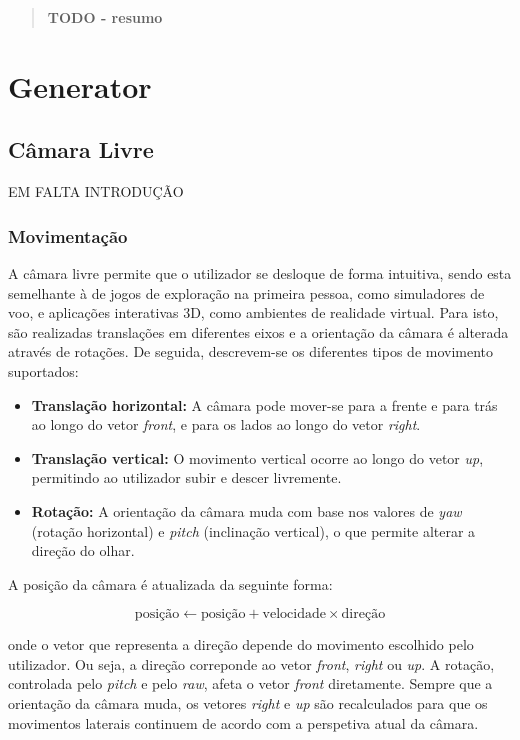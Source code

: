 \documentclass[12pt, a4paper]{article}
\begin{document}
\pagebreak

\begin{abstract}
    \textbf{\color{red} TODO - resumo}
\end{abstract}

\section{Generator}

\subsection{Câmara Livre}

EM FALTA INTRODUÇÃO

\subsubsection{Movimentação}

A câmara livre permite que o utilizador se desloque de forma intuitiva, sendo esta semelhante à
de jogos de exploração na primeira pessoa, como simuladores de voo, e aplicações interativas 3D,
como ambientes de realidade virtual. Para isto, são realizadas translações em diferentes eixos e
a orientação da câmara é alterada através de rotações. De seguida, descrevem-se os diferentes tipos
de movimento suportados:

\begin{itemize}
    \item \textbf{Translação horizontal:} A câmara pode mover-se para a frente e para trás ao longo
    do vetor \emph{front}, e para os lados ao longo do vetor \emph{right}.
    \item \textbf{Translação vertical:} O movimento vertical ocorre ao longo do vetor \emph{up},
    permitindo ao utilizador subir e descer livremente.
    \item \textbf{Rotação:} A orientação da câmara muda com base nos valores de \emph{yaw}
    (rotação horizontal) e \emph{pitch} (inclinação vertical), o que permite alterar a direção do
    olhar.
\end{itemize}

A posição da câmara é atualizada da seguinte forma:

\[
\text{posição} \gets \text{posição} + \text{velocidade} \times \text{direção}
\]

onde o vetor que representa a direção depende do movimento escolhido pelo utilizador. Ou seja, a
direção correponde ao vetor \emph{front}, \emph{right} ou \emph{up}. A rotação, controlada pelo
\emph{pitch} e pelo \emph{raw}, afeta o vetor \emph{front} diretamente. Sempre que a orientação da
câmara muda, os vetores \emph{right} e \emph{up} são recalculados para que os movimentos laterais
continuem de acordo com a perspetiva atual da câmara.
\end{document}
